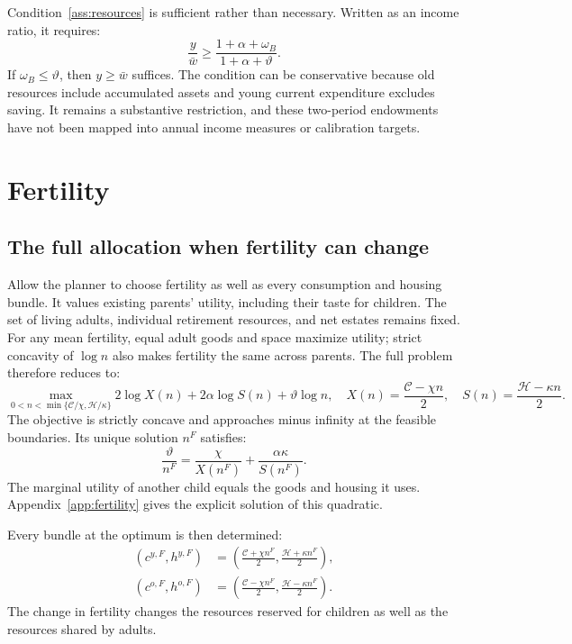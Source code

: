 \documentclass[11pt]{article}
\begin{document}
Condition~\eqref{ass:resources} is sufficient rather than necessary. Written
as an income ratio, it requires:
\begin{equation}
\frac{y}{\bar w}\ge\frac{1+\alpha+\omega_B}{1+\alpha+\vartheta}.
\label{eq:income_ratio}
\end{equation}
If $\omega_B\le\vartheta$, then $y\ge\bar w$ suffices. The condition can
be conservative because old resources include accumulated assets and young
current expenditure excludes saving. It remains a substantive restriction,
and these two-period endowments have not been mapped into annual income
measures or calibration targets.

\section{Fertility}

\subsection{The full allocation when fertility can change}

Allow the planner to choose fertility as well as every consumption and
housing bundle. It values existing parents' utility, including their taste
for children. The set of living adults, individual retirement resources,
and net estates remains fixed. For any mean fertility, equal adult goods
and space maximize utility; strict concavity of $\log n$ also makes fertility
the same across parents. The full problem therefore reduces to:
\begin{equation}
\max_{0<n<\min\{\mathcal C/\chi,\mathcal H/\kappa\}}
 2\log X(n)+2\alpha\log S(n)+\vartheta\log n,
\quad
X(n)=\frac{\mathcal C-\chi n}{2},\quad
S(n)=\frac{\mathcal H-\kappa n}{2}.
\label{eq:joint_problem}
\end{equation}
The objective is strictly concave and approaches minus infinity at the
feasible boundaries. Its unique solution $n^F$ satisfies:
\begin{equation}
\frac{\vartheta}{n^F}
 =\frac{\chi}{X(n^F)}+\frac{\alpha\kappa}{S(n^F)}.
\label{eq:joint_foc}
\end{equation}
The marginal utility of another child equals the goods and housing it uses.
Appendix~\ref{app:fertility} gives the explicit solution of this quadratic.

Every bundle at the optimum is then determined:
\begin{equation}
\boxed{\begin{aligned}
(c^{y,F},h^{y,F})
 &=\left(\frac{\mathcal C+\chi n^F}{2},
         \frac{\mathcal H+\kappa n^F}{2}\right),\\
(c^{o,F},h^{o,F})
 &=\left(\frac{\mathcal C-\chi n^F}{2},
         \frac{\mathcal H-\kappa n^F}{2}\right).
\end{aligned}}
\label{eq:joint_allocation}
\end{equation}
The change in fertility changes the resources reserved for children as well
as the resources shared by adults.
\end{document}
